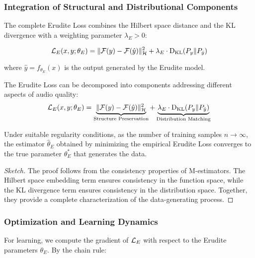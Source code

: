 \subsubsection{Integration of Structural and Distributional Components}

The complete Erudite Loss combines the Hilbert space distance and the KL divergence with a weighting parameter $\lambda_E > 0$:

\begin{equation}
\mathcal{L}_E(x, y; \theta_E) = \|\mathcal{F}(y) - \mathcal{F}(\hat{y})\|_{\mathcal{H}}^2 + \lambda_E \cdot \mathrm{D_{KL}}(P_y \| P_{\hat{y}})
\end{equation}

where $\hat{y} = f_{\theta_E}(x)$ is the output generated by the Erudite model.

\begin{proposition}
The Erudite Loss can be decomposed into components addressing different aspects of audio quality:
\begin{equation}
\mathcal{L}_E(x, y; \theta_E) = \underbrace{\|\mathcal{F}(y) - \mathcal{F}(\hat{y})\|_{\mathcal{H}}^2}_{\text{Structure Preservation}} + \underbrace{\lambda_E \cdot \mathrm{D_{KL}}(P_y \| P_{\hat{y}})}_{\text{Distribution Matching}}
\end{equation}
\end{proposition}

\begin{theorem}
Under suitable regularity conditions, as the number of training samples $n \to \infty$, the estimator $\hat{\theta}_E$ obtained by minimizing the empirical Erudite Loss converges to the true parameter $\theta_E^*$ that generates the data.
\end{theorem}

\begin{proof}[Sketch]
The proof follows from the consistency properties of M-estimators. The Hilbert space embedding term ensures consistency in the function space, while the KL divergence term ensures consistency in the distribution space. Together, they provide a complete characterization of the data-generating process.
\end{proof}

\subsubsection{Optimization and Learning Dynamics}

For learning, we compute the gradient of $\mathcal{L}_E$ with respect to the Erudite parameters $\theta_E$. By the chain rule:

